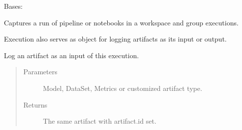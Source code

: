 \documentclass[letterpaper,10pt,english]{sphinxmanual}
\begin{document}
\begin{fulllineitems}
\label{\detokenize{source/md:kubeflow.metadata.metadata.Execution}}
Bases: 

Captures a run of pipeline or notebooks in a workspace and group executions.

Execution also serves as object for logging artifacts as its input or output.

\begin{fulllineitems}
\label{\detokenize{source/md:kubeflow.metadata.metadata.Execution.EXECUTION_TYPE_NAME}}
\end{fulllineitems}


\begin{fulllineitems}
\label{\detokenize{source/md:kubeflow.metadata.metadata.Execution.log_input}}
Log an artifact as an input of this execution.
\begin{quote}\begin{description}
\item[{Parameters}] \leavevmode
{} \textendash{} Model, DataSet, Metrics or customized artifact type.

\item[{Returns}] \leavevmode
The same artifact with artifact.id set.

\end{description}\end{quote}

\end{fulllineitems}


\end{fulllineitems}
\end{document}
